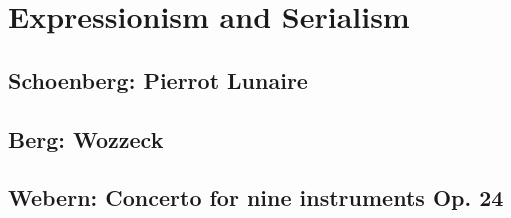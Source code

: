 
\chapter{Expressionism and Serialism}
\label{twentieth}


\section{Schoenberg: Pierrot Lunaire}

\section{Berg: Wozzeck}

\section{Webern: Concerto for nine instruments Op. 24}


